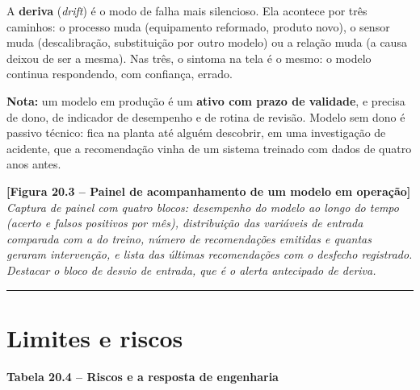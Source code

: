 A \textbf{deriva} (\emph{drift}) é o modo de falha mais silencioso. Ela acontece por três caminhos: o processo
muda (equipamento reformado, produto novo), o sensor muda (descalibração, substituição por outro
modelo) ou a relação muda (a causa deixou de ser a mesma). Nas três, o sintoma na tela é o mesmo:
o modelo continua respondendo, com confiança, errado.

\begin{caixanota}

\textbf{Nota:} um modelo em produção é um \textbf{ativo com prazo de validade}, e precisa de dono, de
indicador de desempenho e de rotina de revisão. Modelo sem dono é passivo técnico: fica na planta
até alguém descobrir, em uma investigação de acidente, que a recomendação vinha de um sistema
treinado com dados de quatro anos antes.

\end{caixanota}

\begin{caixafigura}

\textbf{{[}Figura 20.3 -- Painel de acompanhamento de um modelo em operação{]}}
\emph{Captura de painel com quatro blocos: desempenho do modelo ao longo do tempo (acerto e falsos positivos por mês), distribuição das variáveis de entrada comparada com a do treino, número de recomendações emitidas e quantas geraram intervenção, e lista das últimas recomendações com o desfecho registrado. Destacar o bloco de desvio de entrada, que é o alerta antecipado de deriva.}

\end{caixafigura}

\begin{center}\rule{0.5\linewidth}{0.5pt}\end{center}

\section{Limites e riscos}\label{limites-e-riscos}

\textbf{Tabela 20.4 -- Riscos e a resposta de engenharia}

